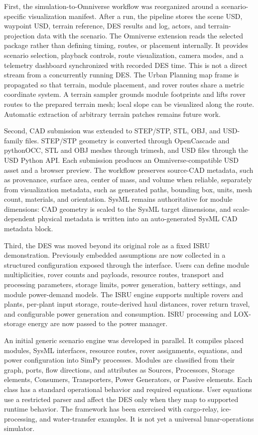 First, the simulation-to-Omniverse workflow was reorganized around a scenario-specific visualization manifest. After a run, the pipeline stores the scene USD, waypoint USD, terrain reference, DES results and log, actors, and terrain-projection data with the scenario. The Omniverse extension reads the selected package rather than defining timing, routes, or placement internally. It provides scenario selection, playback controls, route visualization, camera modes, and a telemetry dashboard synchronized with recorded DES time. This is not a direct stream from a concurrently running DES. The Urban Planning map frame is propagated so that terrain, module placement, and rover routes share a metric coordinate system. A terrain sampler grounds module footprints and lifts rover routes to the prepared terrain mesh; local slope can be visualized along the route. Automatic extraction of arbitrary terrain patches remains future work.

Second, CAD submission was extended to STEP/STP, STL, OBJ, and USD-family files. STEP/STP geometry is converted through OpenCascade and pythonOCC, STL and OBJ meshes through trimesh, and USD files through the USD Python API. Each submission produces an Omniverse-compatible USD asset and a browser preview. The workflow preserves source-CAD metadata, such as provenance, surface area, center of mass, and volume when reliable, separately from visualization metadata, such as generated paths, bounding box, units, mesh count, materials, and orientation. SysML remains authoritative for module dimensions: CAD geometry is scaled to the SysML target dimensions, and scale-dependent physical metadata is written into an auto-generated SysML CAD metadata block.

Third, the DES was moved beyond its original role as a fixed ISRU demonstration. Previously embedded assumptions are now collected in a structured configuration exposed through the interface. Users can define module multiplicities, rover counts and payloads, resource routes, transport and processing parameters, storage limits, power generation, battery settings, and module power-demand models. The ISRU engine supports multiple rovers and plants, per-plant input storage, route-derived haul distances, rover return travel, and configurable power generation and consumption. ISRU processing and LOX-storage energy are now passed to the power manager.

An initial generic scenario engine was developed in parallel. It compiles placed modules, SysML interfaces, resource routes, rover assignments, equations, and power configuration into SimPy processes. Modules are classified from their graph, ports, flow directions, and attributes as Sources, Processors, Storage elements, Consumers, Transporters, Power Generators, or Passive elements. Each class has a standard operational behavior and required equations. User equations use a restricted parser and affect the DES only when they map to supported runtime behavior. The framework has been exercised with cargo-relay, ice-processing, and water-transfer examples. It is not yet a universal lunar-operations simulator.


